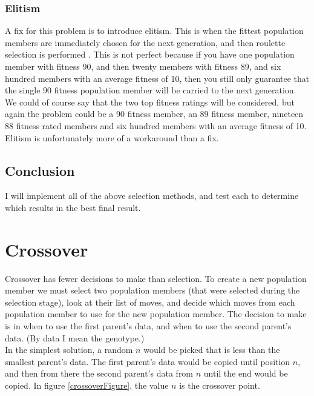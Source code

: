 \documentclass[]{report}
\begin{document}
\subsubsection*{Elitism}

A fix for this problem is to introduce elitism. This is when the fittest population members are immediately chosen for the next generation, and then roulette selection is performed \cite{ECIntro, MitchelGA}. This is not perfect because if you have one population member with fitness 90, and then twenty members with fitness 89, and six hundred members with an average fitness of 10, then you still only guarantee that the single 90 fitness population member will be carried to the next generation. We could of course say that the two top fitness ratings will be considered, but again the problem could be a 90 fitness member, an 89 fitness member, nineteen 88 fitness rated members and six hundred members with an average fitness of 10. Elitism is unfortunately more of a workaround than a fix.


\subsection{Conclusion}

I will implement all of the above selection methods, and test each to determine which results in the best final result.

\section{Crossover}

Crossover has fewer decisions to make than selection. To create a new population member we must select two population members (that were selected during the selection stage), look at their list of moves, and decide which moves from each population member to use for the new population member. The decision to make is in when to use the first parent's data, and when to use the second parent's data. (By data I mean the genotype.)\\

In the simplest solution, a random $n$ would be picked that is less than the smallest parent's data. The first parent's data would be copied until position $n$, and then from there the second parent's data from $n$ until the end would be copied. In figure \ref{crossoverFigure}, the value $n$ is the crossover point. \\
\end{document}
